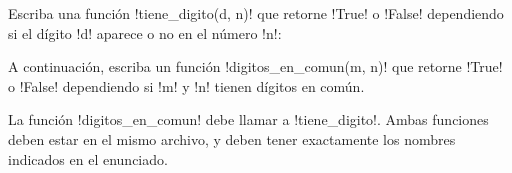 \documentclass[12pt,spanish,letterpaper]{article}
\begin{document}
  Escriba una función \li!tiene_digito(d, n)!
  que retorne \li!True! o \li!False!
  dependiendo si el dígito \li!d!
  aparece o no en el número \li!n!:

  

  A continuación,
  escriba un función \li!digitos_en_comun(m, n)!
  que retorne \li!True! o \li!False!
  dependiendo si \li!m! y \li!n!
  tienen dígitos en común.

  

  La función \li!digitos_en_comun!
  debe llamar a \li!tiene_digito!.
  Ambas funciones deben estar en el mismo archivo,
  y deben tener exactamente los nombres indicados en el enunciado.
\end{document}
